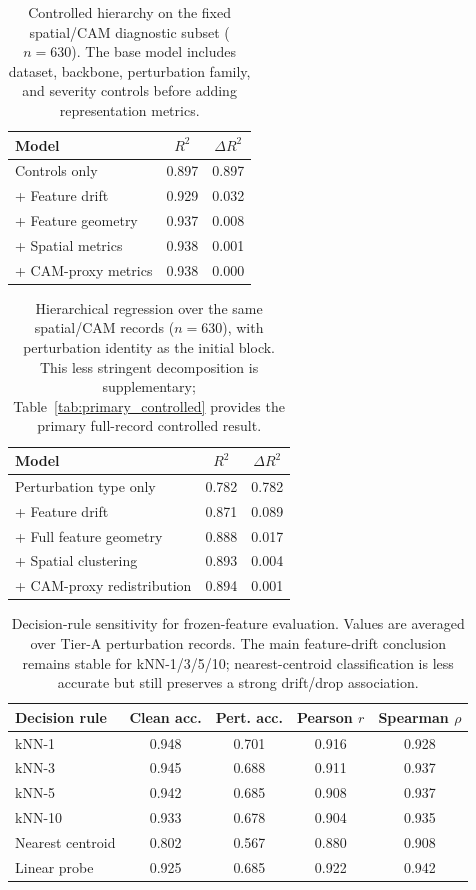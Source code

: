 \documentclass[a4paper,fleqn]{els-cas-templates/cas-sc}
\begin{document}
\begin{table}[pos=htbp]
\centering
\caption{Controlled hierarchy on the fixed spatial/CAM diagnostic subset
($n=630$). The base model includes dataset, backbone, perturbation family, and
severity controls before adding representation metrics.}
\label{tab:hier_strict}
\small
\begin{tabular}{lcc}
\toprule
Model & $R^2$ & $\Delta R^2$ \\
\midrule
Controls only & 0.897 & 0.897 \\
+ Feature drift & 0.929 & 0.032 \\
+ Feature geometry & 0.937 & 0.008 \\
+ Spatial metrics & 0.938 & 0.001 \\
+ CAM-proxy metrics & 0.938 & 0.000 \\
\bottomrule
\end{tabular}
\end{table}

\begin{table}[pos=htbp]
\centering
\caption{Hierarchical regression over the same spatial/CAM records ($n=630$),
with perturbation identity as the initial block. This less stringent
decomposition is supplementary; Table~\ref{tab:primary_controlled} provides the
primary full-record controlled result.}
\label{tab:r2}
\small
\begin{tabular}{lcc}
\toprule
Model & $R^2$ & $\Delta R^2$ \\
\midrule
Perturbation type only & 0.782 & 0.782 \\
+ Feature drift & 0.871 & 0.089 \\
+ Full feature geometry & 0.888 & 0.017 \\
+ Spatial clustering & 0.893 & 0.004 \\
+ CAM-proxy redistribution & 0.894 & 0.001 \\
\bottomrule
\end{tabular}
\end{table}

\begin{table}[pos=htbp]
\centering
\caption{Decision-rule sensitivity for frozen-feature evaluation. Values are averaged over Tier-A perturbation records. The main feature-drift conclusion remains stable for kNN-1/3/5/10; nearest-centroid classification is less accurate but still preserves a strong drift/drop association.}
\label{tab:decision_rule}
\small
\begin{tabular}{lcccc}
\toprule
Decision rule & Clean acc. & Pert. acc. & Pearson $r$ & Spearman $\rho$ \\
\midrule
kNN-1 & 0.948 & 0.701 & 0.916 & 0.928 \\
kNN-3 & 0.945 & 0.688 & 0.911 & 0.937 \\
kNN-5 & 0.942 & 0.685 & 0.908 & 0.937 \\
kNN-10 & 0.933 & 0.678 & 0.904 & 0.935 \\
Nearest centroid & 0.802 & 0.567 & 0.880 & 0.908 \\
Linear probe & 0.925 & 0.685 & 0.922 & 0.942 \\
\bottomrule
\end{tabular}
\end{table}
\end{document}
